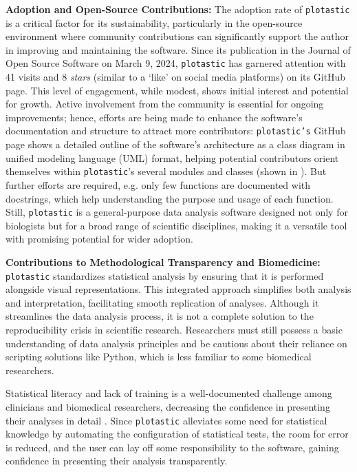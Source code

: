 \textbf{Adoption and Open-Source Contributions:}
The adoption rate of \texttt{plotastic} is a critical factor for its
sustainability, particularly in the open-source environment where community
contributions can significantly support the author in improving and maintaining
the software. Since its publication in the Journal of Open Source Software on
March 9, 2024, \texttt{plotastic} has garnered attention with 41 visits and 8
\emph{stars} (similar to a `like' on social media platforms) on its GitHub page.
This level of engagement, while modest, shows initial interest and potential for
growth. Active involvement from the community is essential for ongoing
improvements; hence, efforts are being made to enhance the software's
documentation and structure to attract more contributors: \texttt{plotastic's}
GitHub page shows a detailed outline of the software's architecture as a class
diagram in unified modeling language (UML) format, helping potential
contributors orient themselves within \texttt{plotastic}'s several modules and
classes (shown in ). But further efforts are
required, e.g. only few functions are documented with docstrings, which help
understanding the purpose and usage of each function. Still, \texttt{plotastic}
is a general-purpose data analysis software designed not only for biologists but
for a broad range of scientific disciplines, making it a versatile tool with
promising potential for wider adoption.





\textbf{Contributions to Methodological Transparency and Biomedicine:}
\texttt{plotastic} standardizes statistical analysis by ensuring that it is
performed alongside visual representations. This integrated approach simplifies
both analysis and interpretation, facilitating smooth replication of analyses.
Although it streamlines the data analysis process, it is not a complete solution
to the reproducibility crisis in scientific research. Researchers must still
possess a basic understanding of data analysis principles and be cautious about
their reliance on scripting solutions like Python, which is less familiar to
some biomedical researchers. 

Statistical literacy and lack of training is a well-documented challenge among
clinicians and biomedical researchers, decreasing the confidence in
presenting their analyses in detail
\cite{lakhlifiIllusionKnowledgeStatistics2023, federerDataLiteracyTraining2016}.
Since \texttt{plotastic} alleviates some need for statistical knowledge by
automating the configuration of statistical tests, the room for error is
reduced, and the user can lay off some responsibility to the software, gaining
confidence in presenting their analysis transparently. 

